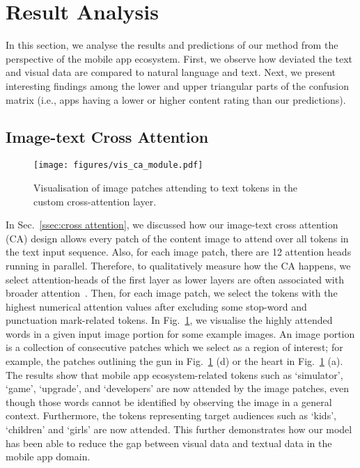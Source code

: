 \section{Result Analysis}

In this section, we analyse the results and predictions of our method from the perspective of the mobile app ecosystem. First, we observe how deviated the text and visual data are compared to natural language and text. Next, we present interesting findings among the lower and upper triangular parts of the confusion matrix (i.e., apps having a lower or higher content rating than our predictions). 


\subsection{Image-text Cross Attention}
\begin{figure}[ht]  
    \centering
    \texttt{[image: figures/vis\_ca\_module.pdf]}
    \caption{Visualisation of image patches attending to text tokens in the custom cross-attention layer.}
    \label{fig:ca_visualized}
\end{figure}

In Sec.~\ref{ssec:cross attention}, we discussed how our image-text cross attention (CA) design allows every patch of the content image to attend over all tokens in the text input sequence. Also, for each image patch, there are 12 attention heads running in parallel. Therefore, to qualitatively measure how the CA happens, we select attention-heads of the first layer as lower layers are often associated with broader attention~\cite{vig_2019_multiscale}. Then, for each image patch, we select the tokens with the highest numerical attention values after excluding some stop-word and punctuation mark-related tokens. In Fig.~\ref{fig:ca_visualized}, we visualise the highly attended words in a given input image portion for some example images. An image portion is a collection of consecutive patches which we select as a region of interest; for example, the patches outlining the gun in Fig.~\ref{fig:ca_visualized} (d) or the heart in Fig.~\ref{fig:ca_visualized} (a). The results show that mobile app ecosystem-related tokens such as `simulator', `game', `upgrade', and `developers' are now attended by the image patches, even though those words cannot be identified by observing the image in a general context. Furthermore, the tokens representing target audiences such as `kids', `children' and `girls' are now attended. This further demonstrates how our model has been able to reduce the gap between visual data and textual data in the mobile app domain.

